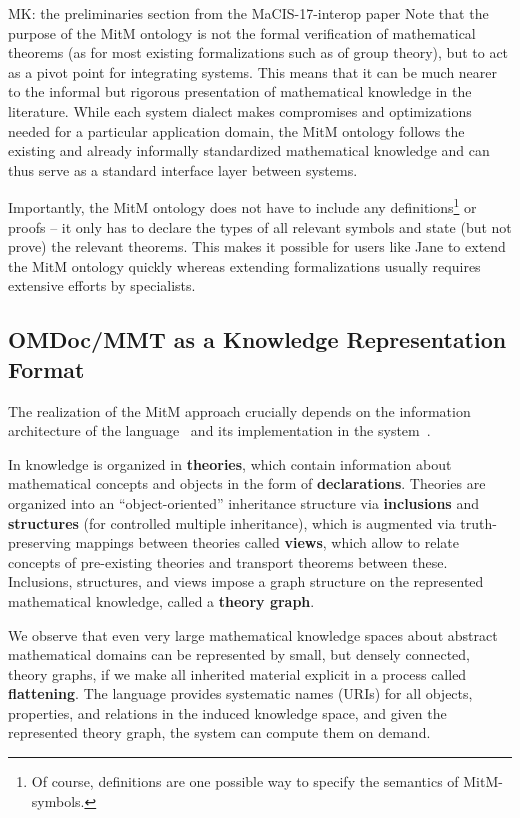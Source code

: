 \begin{newpart}{MK: the preliminaries section from the MaCIS-17-interop paper}
Note that the purpose of the MitM ontology is not the formal verification of mathematical
theorems (as for most existing formalizations such as \cite{Gonthier+:mcpoot13} of group
theory), but to act as a pivot point for integrating systems. This means that it can be
much nearer to the informal but rigorous presentation of mathematical knowledge in the
literature. While each system dialect makes compromises and optimizations needed for a
particular application domain, the MitM ontology follows the existing and already
informally standardized mathematical knowledge and can thus serve as a standard interface
layer between systems.

Importantly, the MitM ontology does not have to include any definitions\footnote{Of course, definitions are one possible way to specify the semantics of MitM-symbols.} or proofs -- it only has to declare the types of all relevant symbols and state (but not prove) the relevant theorems.
This makes it possible for users like Jane to extend the MitM ontology quickly whereas
extending formalizations usually requires extensive efforts by specialists.

\subsection{OMDoc/MMT as a Knowledge Representation Format}\label{sec:ommt}
The realization of the MitM approach crucially depends on the information architecture of
the \ommt language~\cite{Kohlhase:OMDoc1.2,RabKoh:WSMSML13} and its implementation in the
\mmt system~\cite{Rabe:MAGMS13,uniformal:on}.

In \ommt knowledge is organized in \textbf{theories}, which contain information about
mathematical concepts and objects in the form of \textbf{declarations}. Theories are
organized into an ``object-oriented'' inheritance structure via \textbf{inclusions} and
\textbf{structures} (for controlled multiple inheritance), which is augmented via
truth-preserving mappings between theories called \textbf{views}, which allow to relate
concepts of pre-existing theories and transport theorems between these. Inclusions,
structures, and views impose a graph structure on the represented mathematical knowledge,
called a \textbf{theory graph}. 

We observe that even very large mathematical knowledge spaces about abstract mathematical
domains can be represented by small, but densely connected, theory graphs, if we make all
inherited material explicit in a process called \textbf{flattening}. The \ommt language
provides systematic names (\mmt URIs) for all objects, properties, and relations in the
induced knowledge space, and given the represented theory graph, the \mmt system can
compute them on demand. 


\end{newpart}
